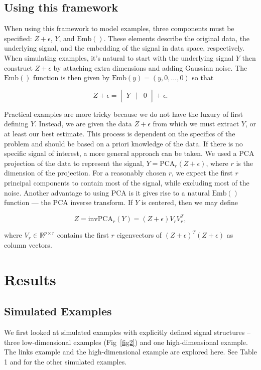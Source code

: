 \documentclass[10pt,letterpaper]{article}
\begin{document}
\subsection*{Using this framework}
When using this framework to model examples, three components must be specified: $Z + \epsilon$, $Y$, and $\textrm{Emb}()$. These elements describe the original data, the underlying signal, and the embedding of the signal in data space, respectively. When simulating examples, it's natural to start with the underlying signal $Y$ then construct $Z + \epsilon$ by attaching extra dimensions and adding Gaussian noise. The $\textrm{Emb}()$ function is then given by $\textrm{Emb}(y) = (y,0,\hdots,0)$ so that
\begin{linenomath}$$Z + \epsilon = \begin{bmatrix}
Y & \vert & 0
\end{bmatrix} + \epsilon.$$\end{linenomath}

Practical examples are more tricky because we do not have the luxury of first defining $Y$. Instead, we are given the data $Z + \epsilon$ from which we must extract $Y$, or at least our best estimate. This process is dependent on the specifics of the problem and should be based on a priori knowledge of the data. If there is no specific signal of interest, a more general approach can be taken. We used a PCA projection of the data to represent the signal, $Y = \textrm{PCA}_r(Z + \epsilon)$, where $r$ is the dimension of the projection. For a reasonably chosen $r$, we expect the first $r$ principal components to contain most of the signal, while excluding most of the noise. Another advantage to using PCA is it gives rise to a natural $\textrm{Emb}()$ function --- the PCA inverse transform. If $Y$ is centered, then we may define \begin{linenomath}$$Z = \textrm{invPCA}_r(Y) = (Z + \epsilon)V_rV_r^T,$$\end{linenomath} where $V_r \in \mathbb{R}^{p \times r}$ contains the first $r$ eigenvectors of $(Z+\epsilon)^T(Z+\epsilon)$ as column vectors.

\section*{Results}

\subsection*{Simulated Examples}
We first looked at simulated examples with explicitly defined signal structures -- three low-dimensional examples (Fig~\ref{fig2}) and one high-dimensional example. The links example and the high-dimensional example are explored here. See Table 1 and  for the other simulated examples.
\end{document}
